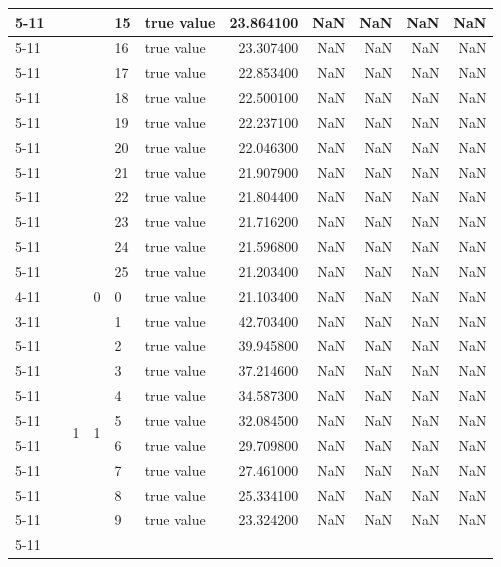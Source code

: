 \begin{tabular}{llllllrrrrr}
\cline{5-11}
 &  &  &  & 15 & true value & 23.864100 & NaN & NaN & NaN & NaN \\
\cline{5-11}
 &  &  &  & 16 & true value & 23.307400 & NaN & NaN & NaN & NaN \\
\cline{5-11}
 &  &  &  & 17 & true value & 22.853400 & NaN & NaN & NaN & NaN \\
\cline{5-11}
 &  &  &  & 18 & true value & 22.500100 & NaN & NaN & NaN & NaN \\
\cline{5-11}
 &  &  &  & 19 & true value & 22.237100 & NaN & NaN & NaN & NaN \\
\cline{5-11}
 &  &  &  & 20 & true value & 22.046300 & NaN & NaN & NaN & NaN \\
\cline{5-11}
 &  &  &  & 21 & true value & 21.907900 & NaN & NaN & NaN & NaN \\
\cline{5-11}
 &  &  &  & 22 & true value & 21.804400 & NaN & NaN & NaN & NaN \\
\cline{5-11}
 &  &  &  & 23 & true value & 21.716200 & NaN & NaN & NaN & NaN \\
\cline{5-11}
 &  &  &  & 24 & true value & 21.596800 & NaN & NaN & NaN & NaN \\
\cline{5-11}
 &  &  &  & 25 & true value & 21.203400 & NaN & NaN & NaN & NaN \\
\cline{4-11} \cline{5-11}
 &  &  & 0 & 0 & true value & 21.103400 & NaN & NaN & NaN & NaN \\
\cline{3-11} \cline{4-11} \cline{5-11}
 &  & \multirow[t]{101}{*}{1} & \multirow[t]{25}{*}{1} & 1 & true value & 42.703400 & NaN & NaN & NaN & NaN \\
\cline{5-11}
 &  &  &  & 2 & true value & 39.945800 & NaN & NaN & NaN & NaN \\
\cline{5-11}
 &  &  &  & 3 & true value & 37.214600 & NaN & NaN & NaN & NaN \\
\cline{5-11}
 &  &  &  & 4 & true value & 34.587300 & NaN & NaN & NaN & NaN \\
\cline{5-11}
 &  &  &  & 5 & true value & 32.084500 & NaN & NaN & NaN & NaN \\
\cline{5-11}
 &  &  &  & 6 & true value & 29.709800 & NaN & NaN & NaN & NaN \\
\cline{5-11}
 &  &  &  & 7 & true value & 27.461000 & NaN & NaN & NaN & NaN \\
\cline{5-11}
 &  &  &  & 8 & true value & 25.334100 & NaN & NaN & NaN & NaN \\
\cline{5-11}
 &  &  &  & 9 & true value & 23.324200 & NaN & NaN & NaN & NaN \\
\cline{5-11}

\end{tabular}
